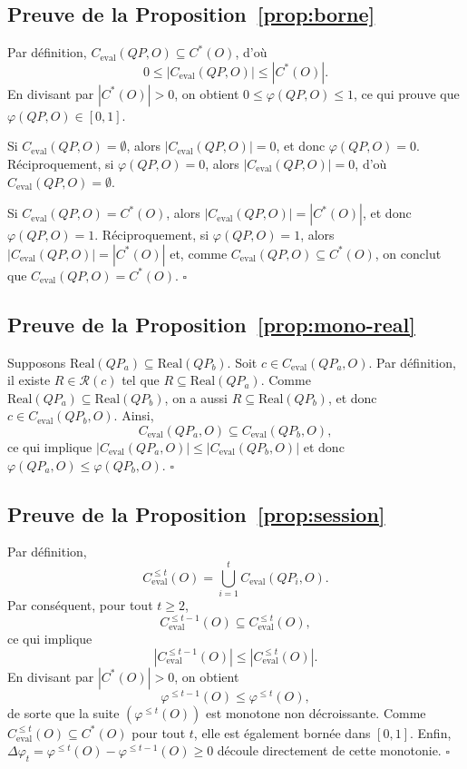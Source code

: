 \documentclass[journal]{IEEEtran}
\begin{document}
\subsection*{Preuve de la Proposition~\ref{prop:borne}}

Par définition, $C_{\mathrm{eval}}(QP,O)\subseteq C^*(O)$, d'où
\[
0\le |C_{\mathrm{eval}}(QP,O)|\le |C^*(O)|.
\]
En divisant par $|C^*(O)|>0$, on obtient $0\le \varphi(QP,O)\le 1$, ce qui prouve que $\varphi(QP,O)\in[0,1]$.

Si $C_{\mathrm{eval}}(QP,O)=\emptyset$, alors $|C_{\mathrm{eval}}(QP,O)|=0$, et donc $\varphi(QP,O)=0$. Réciproquement, si $\varphi(QP,O)=0$, alors $|C_{\mathrm{eval}}(QP,O)|=0$, d'où $C_{\mathrm{eval}}(QP,O)=\emptyset$.

Si $C_{\mathrm{eval}}(QP,O)=C^*(O)$, alors $|C_{\mathrm{eval}}(QP,O)|=|C^*(O)|$, et donc $\varphi(QP,O)=1$. Réciproquement, si $\varphi(QP,O)=1$, alors $|C_{\mathrm{eval}}(QP,O)|=|C^*(O)|$ et, comme $C_{\mathrm{eval}}(QP,O)\subseteq C^*(O)$, on conclut que $C_{\mathrm{eval}}(QP,O)=C^*(O)$. \hfill$\square$

\subsection*{Preuve de la Proposition~\ref{prop:mono-real}}

Supposons $\mathrm{Real}(QP_a)\subseteq \mathrm{Real}(QP_b)$. Soit $c\in C_{\mathrm{eval}}(QP_a,O)$. Par définition, il existe $R\in\mathcal{R}(c)$ tel que $R\subseteq \mathrm{Real}(QP_a)$. Comme $\mathrm{Real}(QP_a)\subseteq \mathrm{Real}(QP_b)$, on a aussi $R\subseteq \mathrm{Real}(QP_b)$, et donc $c\in C_{\mathrm{eval}}(QP_b,O)$. Ainsi,
\[
C_{\mathrm{eval}}(QP_a,O)\subseteq C_{\mathrm{eval}}(QP_b,O),
\]
ce qui implique $|C_{\mathrm{eval}}(QP_a,O)|\le |C_{\mathrm{eval}}(QP_b,O)|$ et donc $\varphi(QP_a,O)\le \varphi(QP_b,O)$. \hfill$\square$

\subsection*{Preuve de la Proposition~\ref{prop:session}}

Par définition,
\[
C_{\mathrm{eval}}^{\le t}(O)=\bigcup_{i=1}^{t} C_{\mathrm{eval}}(QP_i,O).
\]
Par conséquent, pour tout $t\ge 2$,
\[
C_{\mathrm{eval}}^{\le t-1}(O)\subseteq C_{\mathrm{eval}}^{\le t}(O),
\]
ce qui implique
\[
|C_{\mathrm{eval}}^{\le t-1}(O)|\le |C_{\mathrm{eval}}^{\le t}(O)|.
\]
En divisant par $|C^*(O)|>0$, on obtient
\[
\varphi^{\le t-1}(O)\le \varphi^{\le t}(O),
\]
de sorte que la suite $(\varphi^{\le t}(O))$ est monotone non décroissante. Comme $C_{\mathrm{eval}}^{\le t}(O)\subseteq C^*(O)$ pour tout $t$, elle est également bornée dans $[0,1]$. Enfin, $\Delta\varphi_t=\varphi^{\le t}(O)-\varphi^{\le t-1}(O)\ge 0$ découle directement de cette monotonie. \hfill$\square$
\end{document}
